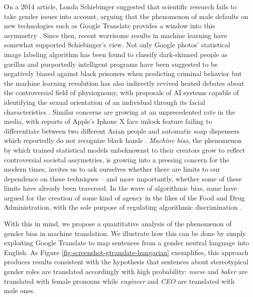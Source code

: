 \documentclass[fleqn,10pt]{article}
\begin{document}
On a 2014 article, Londa Schiebinger suggested that scientific research fails to take gender issues into account, arguing that the phenomenon of male defaults on new technologies such as Google Translate provides a window into this asymmetry \cite{schiebinger2014scientific}. Since then, recent worrisome results in machine learning have somewhat supported Schiebinger's view. Not only Google photos' statistical image labeling algorithm has been found to classify dark-skinned people as gorillas \cite{garcia2016racist} and purportedly intelligent programs have been suggested to be negatively biased against black prisoners when predicting criminal behavior \cite{angwin2016machine} but the machine learning revolution has also indirectly revived heated debates about the controversial field of physiognomy, with proposals of AI systems capable of identifying the sexual orientation of an individual through its facial characteristics \cite{wang2017deep}. Similar concerns are growing at an unprecedented rate in the media, with reports of Apple's Iphone X face unlock feature failing to differentiate between two different Asian people \cite{womanunlockphone2017} and automatic soap dispensers which reportedly do not recognize black hands \cite{racistsoapdispenser2017}. \emph{Machine bias}, the phenomenon by which trained statistical models unbeknownst to their creators grow to reflect controversial societal assymetries, is growing into a pressing concern for the modern times, invites us to ask ourselves whether there are limits to our dependence on these techniques -- and more importantly, whether some of these limits have already been traversed. In the wave of algorithmic bias, some have argued for the creation of some kind of agency in the likes of the Food and Drug Administration, with the sole purpose of regulating algorithmic discrimination \cite{kirkpatrick2016battling}.

With this in mind, we propose a quantitative analysis of the phenomenon of gender bias in machine translation. We illustrate how this can be done by simply exploiting Google Translate to map sentences from a gender neutral language into English. As Figure \ref{fig:screenshot-gtranslate-hungarian} exemplifies, this approach produces results consistent with the hypothesis that sentences about stereotypical gender roles are translated accordingly with high probability: \emph{nurse} and \emph{baker} are translated with female pronouns while \emph{engineer} and \emph{CEO} are translated with male ones.
\end{document}
